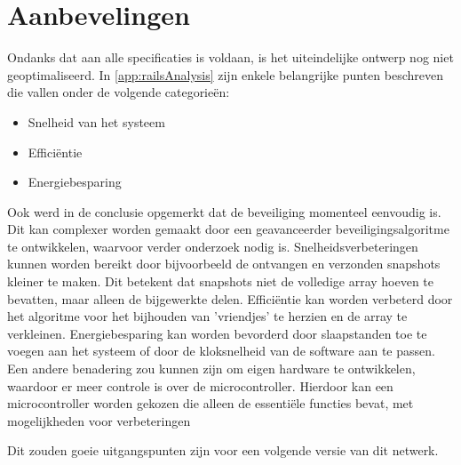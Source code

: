 \section{Aanbevelingen} \label{sec:aanbevelingen}


Ondanks dat aan alle specificaties is voldaan, is het uiteindelijke ontwerp nog niet geoptimaliseerd. In \autoref{app:railsAnalysis} zijn enkele belangrijke punten beschreven die vallen onder de volgende categorieën:
\begin{itemize}
\item Snelheid van het systeem
\item Efficiëntie
\item Energiebesparing
\end{itemize}

Ook werd in de conclusie opgemerkt dat de beveiliging momenteel eenvoudig is. Dit kan complexer worden gemaakt door een geavanceerder beveiligingsalgoritme te ontwikkelen, waarvoor verder onderzoek nodig is. Snelheidsverbeteringen kunnen worden bereikt door bijvoorbeeld de ontvangen en verzonden snapshots kleiner te maken. Dit betekent dat snapshots niet de volledige array hoeven te bevatten, maar alleen de bijgewerkte delen. Efficiëntie kan worden verbeterd door het algoritme voor het bijhouden van 'vriendjes' te herzien en de array te verkleinen. Energiebesparing kan worden bevorderd door slaapstanden toe te voegen aan het systeem of door de kloksnelheid van de software aan te passen. Een andere benadering zou kunnen zijn om eigen hardware te ontwikkelen, waardoor er meer controle is over de microcontroller. Hierdoor kan een microcontroller worden gekozen die alleen de essentiële functies bevat, met mogelijkheden voor verbeteringen

Dit zouden goeie uitgangspunten zijn voor een volgende versie van dit netwerk.